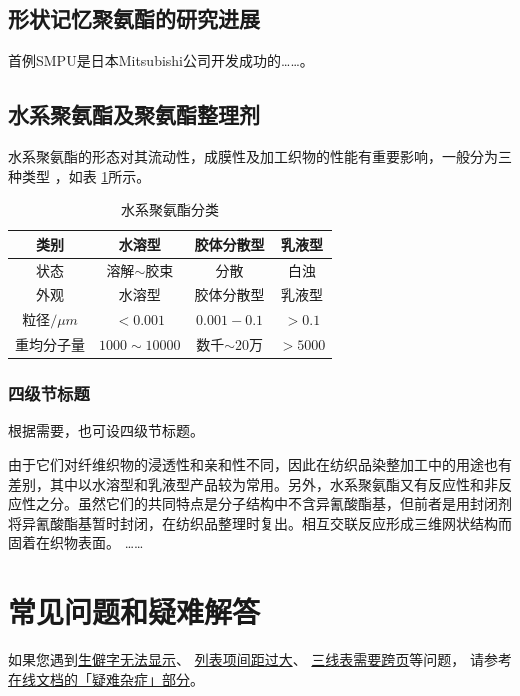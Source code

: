 \subsection{形状记忆聚氨酯的研究进展}
首例SMPU是日本Mitsubishi公司开发成功的……。

\subsection{水系聚氨酯及聚氨酯整理剂}

水系聚氨酯的形态对其流动性，成膜性及加工织物的性能有重要影响，一般分为三种类型\cite{Jiang2005Size} ，如表 \ref{tab:category}所示。

\begin{table}[hbt]
  \centering
  \caption{水系聚氨酯分类} \label{tab:category}
  \begin{tabular*}{0.9\textwidth}{@{\extracolsep{\fill}}cccc}
  \toprule
    类别			&水溶型		&胶体分散型		&乳液型 \\
  \midrule
    状态			&溶解$\sim$胶束	&分散		&白浊 \\
    外观			&水溶型		&胶体分散型		&乳液型 \\
    粒径$/\mu m$	&$<0.001$		&$0.001-0.1$		&$>0.1$ \\
    重均分子量	&$1000\sim 10000$	&数千$\sim 20$万 &$>5000$ \\
  \bottomrule
  \end{tabular*}
\end{table}

\subsubsection{四级节标题}

根据需要，也可设四级节标题。

由于它们对纤维织物的浸透性和亲和性不同，因此在纺织品染整加工中的用途也有差别，其中以水溶型和乳液型产品较为常用。另外，水系聚氨酯又有反应性和非反应性之分。虽然它们的共同特点是分子结构中不含异氰酸酯基，但前者是用封闭剂将异氰酸酯基暂时封闭，在纺织品整理时复出。相互交联反应形成三维网状结构而固着在织物表面。
……


\section{常见问题和疑难解答}

如果您遇到\href{https://bithesis.bitnp.net/faq/char-missing.html}{生僻字无法显示}、
\href{https://bithesis.bitnp.net/faq/enumitem-nosep.html}{列表项间距过大}、
\href{https://bithesis.bitnp.net/faq/longtable.html}{三线表需要跨页}等问题，
请参考\textcolor{magenta}{\href{https://bithesis.bitnp.net/faq/}{在线文档的「疑难杂症」部分}}。
